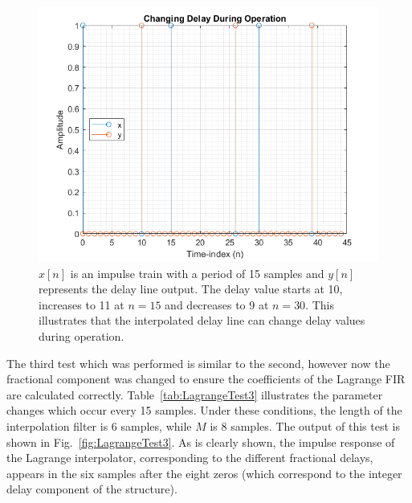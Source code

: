\documentclass[../main.tex]{subfiles}
\begin{document}
\begin{figure}[h]
    \centering
    \includegraphics[scale=.65]{./images/plots/LagrangeTest2.png}
    \caption{$x[n]$ is an impulse train with a period of 15 samples and $y[n]$ represents the delay line output. The delay value starts at 10, increases to 11 at $n = 15$ and decreases to 9 at $n = 30$. This illustrates that the interpolated delay line can change delay values during operation.}
    \label{fig:LagrangeTest2}
\end{figure}

The third test which was performed is similar to the second, however now the fractional component was changed to ensure the coefficients of the Lagrange FIR are calculated correctly. Table~\ref{tab:LagrangeTest3} illustrates the parameter changes which occur every 15 samples. Under these conditions, the length of the interpolation filter is 6 samples, while $M$ is 8 samples. The output of this test is shown in Fig.~\ref{fig:LagrangeTest3}. As is clearly shown, the impulse response of the Lagrange interpolator, corresponding to the different fractional delays, appears in the six samples after the eight zeros (which correspond to the integer delay component of the structure).
\end{document}
